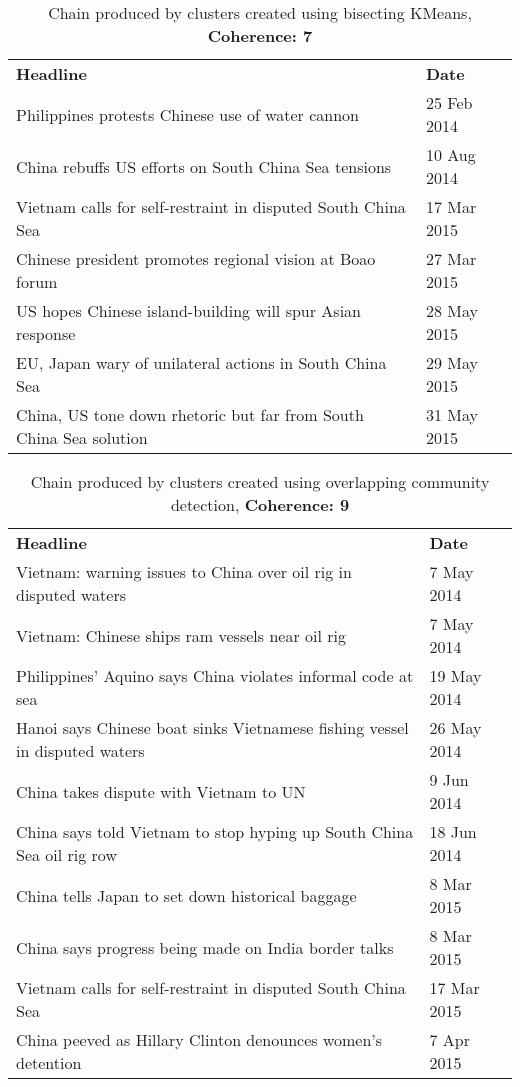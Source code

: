 \documentclass[12pt]{article}
\begin{document}
\begin{table}[H]
\centering
\caption{Chain produced by clusters created using bisecting KMeans, \textbf{Coherence: 7} }
\label{table2}
\begin{tabular}{ll}
{\bf Headline}                                                     & {\bf Date}  \\
Philippines protests Chinese use of water cannon                   & 25 Feb 2014 \\
China rebuffs US efforts on South China Sea tensions               & 10 Aug 2014 \\
Vietnam calls for self-restraint in disputed South China Sea       & 17 Mar 2015 \\
Chinese president promotes regional vision at Boao forum           & 27 Mar 2015 \\
US hopes Chinese island-building will spur Asian response          & 28 May 2015 \\
EU, Japan wary of unilateral actions in South China Sea            & 29 May 2015 \\
China, US tone down rhetoric but far from South China Sea solution & 31 May 2015
\end{tabular}
\end{table}

\begin{table}[H]
\centering
\caption{Chain produced by clusters created using overlapping community detection, \textbf{Coherence: 9} }
\label{table3}
\begin{tabular}{ll}
{\bf Headline}                                                             & {\bf Date}  \\
Vietnam: warning issues to China over oil rig in disputed waters           & 7 May 2014  \\
Vietnam: Chinese ships ram vessels near oil rig                            & 7 May 2014  \\
Philippines’ Aquino says China violates informal code at sea               & 19 May 2014 \\
Hanoi says Chinese boat sinks Vietnamese fishing vessel in disputed waters & 26 May 2014 \\
China takes dispute with Vietnam to UN                                     & 9 Jun 2014  \\
China says told Vietnam to stop hyping up South China Sea oil rig row      & 18 Jun 2014 \\
China tells Japan to set down historical baggage                           & 8 Mar 2015  \\
China says progress being made on India border talks                       & 8 Mar 2015  \\
Vietnam calls for self-restraint in disputed South China Sea               & 17 Mar 2015 \\
China peeved as Hillary Clinton denounces women’s detention                & 7 Apr 2015 
\end{tabular}
\end{table}
\end{document}
